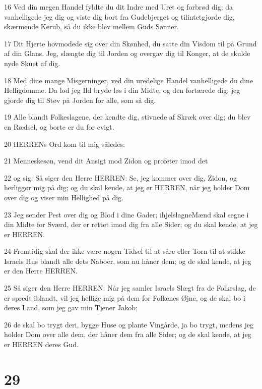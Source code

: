 \par 16 Ved din megen Handel fyldte du dit Indre med Uret og forbrød dig; da vanhelligede jeg dig og viste dig bort fra Gudebjerget og tilintetgjorde dig, skærmende Kerub, så du ikke blev mellem Guds Sønner.
\par 17 Dit Hjerte hovmodede sig over din Skønhed, du satte din Visdom til på Grund af din Glans. Jeg, slængte dig til Jorden og overgav dig til Konger, at de skulde nyde Skuet af dig.
\par 18 Med dine mange Misgerninger, ved din uredelige Handel vanhelligede du dine Helligdomme. Da lod jeg Ild bryde løs i din Midte, og den fortærede dig; jeg gjorde dig til Støv på Jorden for alle, som så dig.
\par 19 Alle blandt Folkeslagene, der kendte dig, stivnede af Skræk over dig; du blev en Rædsel, og borte er du for evigt.
\par 20 HERRENs Ord kom til mig således:
\par 21 Menneskesøn, vend dit Ansigt mod Zidon og profeter imod det
\par 22 og sig: Så siger den Herre HERREN: Se, jeg kommer over dig, Zidon, og herliggør mig på dig; og du skal kende, at jeg er HERREN, når jeg holder Dom over dig og viser min Hellighed på dig.
\par 23 Jeg sender Pest over dig og Blod i dine Gader; ihjelslagneMænd skal segne i din Midte for Sværd, der er rettet imod dig fra alle Sider; og du skal kende, at jeg er HERREN.
\par 24 Fremtidig skal der ikke være nogen Tidsel til at såre eller Torn til at stikke Israels Hus blandt alle dets Naboer, som nu håner dem; og de skal kende, at jeg er den Herre HERREN.
\par 25 Så siger den Herre HERREN: Når jeg samler Israels Slægt fra de Folkeslag, de er spredt iblandt, vil jeg hellige mig på dem for Folkenes Øjne, og de skal bo i deres Land, som jeg gav min Tjener Jakob;
\par 26 de skal bo trygt deri, bygge Huse og plante Vingårde, ja bo trygt, medens jeg holder Dom over alle dem, der håner dem fra alle Sider; og de skal kende, at jeg er HERREN deres Gud.

\chapter{29}

